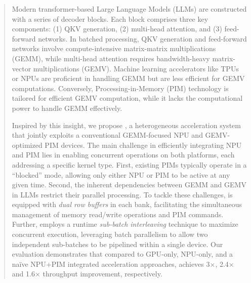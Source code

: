 \begin{abstract}
%
%
Modern transformer-based Large Language Models (LLMs) are constructed with a series of decoder blocks.
%
Each block comprises three key components: (1) QKV generation, (2) multi-head attention, and (3) feed-forward networks.
%
In batched processing, QKV generation and feed-forward networks involve compute-intensive matrix-matrix multiplications (GEMM), while multi-head attention requires bandwidth-heavy matrix-vector multiplications (GEMV).
%
Machine learning accelerators like TPUs or NPUs are proficient in handling GEMM but are less efficient for GEMV computations.
%
Conversely, Processing-in-Memory (PIM) technology is tailored for efficient GEMV computation, while it lacks the computational power to handle GEMM effectively.


Inspired by this insight, we propose \neupims, a heterogeneous acceleration system that jointly exploits a conventional GEMM-focused NPU and GEMV-optimized PIM devices.
%
The main challenge in efficiently integrating NPU and PIM lies in enabling concurrent operations on both platforms, each addressing a specific kernel type.
%
First, existing PIMs typically operate in a ``blocked'' mode, allowing only either NPU or PIM to be active at any given time.
%
Second, the inherent dependencies between GEMM and GEMV in LLMs restrict their parallel processing.
%
To tackle these challenges, \neupims is equipped with \emph{dual row buffers} in each bank, facilitating the simultaneous management of memory read/write operations and PIM commands.
%
Further, \neupims employs a runtime \emph{sub-batch interleaving} technique to maximize concurrent execution, leveraging batch parallelism to allow two independent sub-batches to be pipelined within a single \neupims device.
%
Our evaluation demonstrates that compared to GPU-only, NPU-only, and a na\"ive NPU+PIM integrated acceleration approaches, \neupims achieves 3$\times$, 2.4$\times$ and 1.6$\times$ throughput improvement, respectively.

\end{abstract}